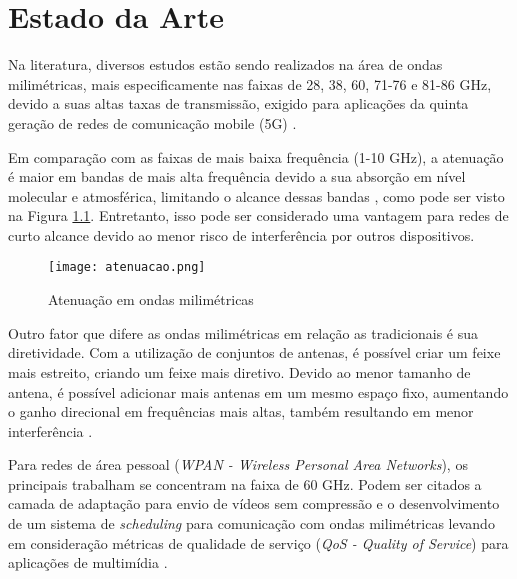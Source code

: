 \chapter{Estado da Arte}



Na literatura, diversos estudos estão sendo realizados na área de ondas milimétricas, mais especificamente nas faixas de 28, 38, 60, 71-76 e 81-86 GHz, devido a suas altas taxas de transmissão, exigido para aplicações da quinta geração de redes de comunicação mobile (5G) \cite{8567053}.

Em comparação com as faixas de mais baixa frequência (1-10 GHz), a atenuação é maior em bandas de mais alta frequência devido a sua absorção em nível molecular e atmosférica, limitando o alcance dessas bandas \cite{ichkov2017potentials}, como pode ser visto na Figura \ref{atenuacao}. Entretanto, isso pode ser considerado uma vantagem para redes de curto alcance devido ao menor risco de interferência por outros dispositivos.

\begin{figure}[htbp]
    \centering
    \caption{Atenuação em ondas milimétricas}
    \texttt{[image: atenuacao.png]}
    
    \centering
    \label{atenuacao}
\end{figure}

Outro fator que difere as ondas milimétricas em relação as tradicionais é sua diretividade. Com a utilização de conjuntos de antenas, é possível criar um feixe mais estreito, criando um feixe mais diretivo. Devido ao menor tamanho de antena, é possível adicionar mais antenas em um mesmo espaço fixo, aumentando o ganho direcional em frequências mais altas, também resultando em menor interferência \cite{ichkov2017potentials}.

Para redes de área pessoal (\textit{WPAN - Wireless Personal Area Networks}), os principais trabalham se concentram na faixa de 60 GHz. Podem ser citados a camada de adaptação para envio de vídeos sem compressão \cite{7398126} e o desenvolvimento de um sistema de \textit{scheduling} para comunicação com ondas milimétricas levando em consideração métricas de qualidade de serviço (\textit{QoS - Quality of Service}) para aplicações de multimídia \cite{7010539}.

